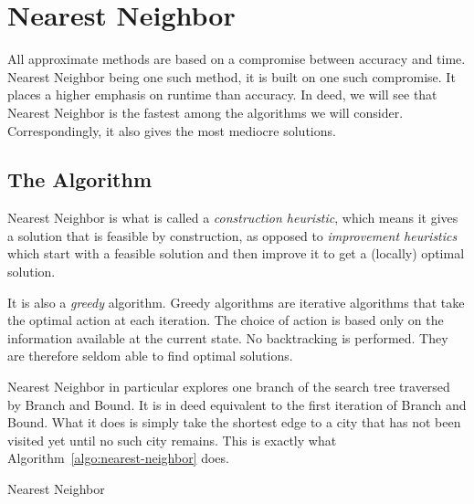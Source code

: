 \section{Nearest Neighbor}


All approximate methods are based on a compromise between accuracy and time. Nearest Neighbor being one such method, it is built on one such compromise. It places a higher emphasis on runtime than accuracy. In deed, we will see that Nearest Neighbor is the fastest among the algorithms we will consider. Correspondingly, it also gives the most mediocre solutions.

\subsection{The Algorithm}

Nearest Neighbor is what is called a \emph{construction heuristic}, which means it gives a solution that is feasible by construction, as opposed to \emph{improvement heuristics} which start with a feasible solution and then improve it to get a (locally) optimal solution.

It is also a \emph{greedy} algorithm. Greedy algorithms are iterative algorithms that take the optimal action at each iteration. The choice of action is based only on the information available at the current state. No backtracking is performed. They are therefore seldom able to find optimal solutions.

Nearest Neighbor in particular explores one branch of the search tree traversed by Branch and Bound. It is in deed equivalent to the first iteration of Branch and Bound. What it does is simply take the shortest edge to a city that has not been visited yet until no such city remains. This is exactly what Algorithm~\ref{algo:nearest-neighbor} does.

\begin{algorithm}
    \caption{Nearest Neighbor}
    \label{algo:nearest-neighbor}
     
\end{algorithm}

